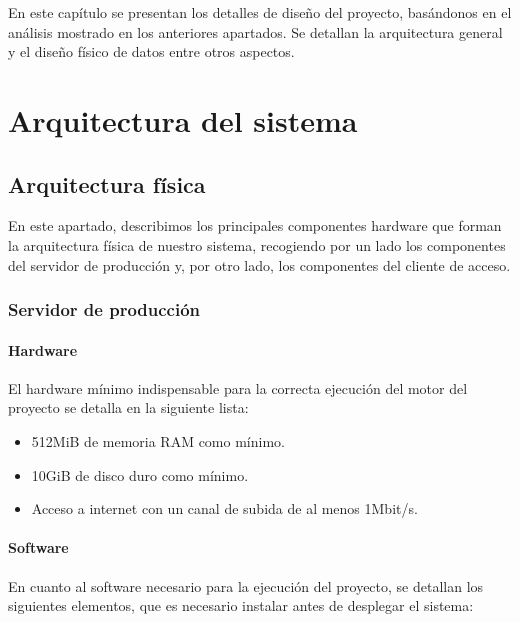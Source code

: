 En este capítulo se presentan los detalles de diseño del proyecto, basándonos en
el análisis mostrado en los anteriores apartados. Se detallan la arquitectura
general y el diseño físico de datos entre otros aspectos.

\section{Arquitectura del sistema}

\subsection{Arquitectura física}

En este apartado, describimos los principales componentes hardware que forman la
arquitectura física de nuestro sistema, recogiendo por un lado los componentes
del servidor de producción y, por otro lado, los componentes del cliente de acceso.

\subsubsection{Servidor de producción}
\label{subsec:entorno-produccion}

\paragraph{Hardware}

El hardware mínimo indispensable para la correcta ejecución del motor del
proyecto se detalla en la siguiente lista:

\begin{itemize}
\item 512MiB de memoria RAM como mínimo.
\item 10GiB de disco duro como mínimo.
\item Acceso a internet con un canal de subida de al menos 1Mbit/s.
\end{itemize}

\paragraph{Software}

En cuanto al software necesario para la ejecución del proyecto, se detallan los
siguientes elementos, que es necesario instalar antes de desplegar el sistema:

